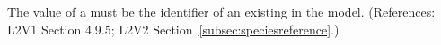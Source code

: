 The value of a \SpeciesReference {}  must be the
identifier of an existing \Species in the model.  (References: L2V1 Section
4.9.5; L2V2 Section~\ref{subsec:speciesreference}.)
